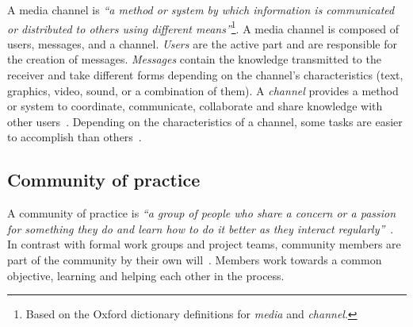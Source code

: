     A media channel is \textit{``a method or system by which information is communicated or distributed to others using different means''}\footnote{Based on the Oxford dictionary definitions for \emph{media} and \emph{channel}.}.
    A media channel is composed of users, messages, and a channel.
    \textit{Users} are the active part and are responsible for the creation of messages.
    \textit{Messages} contain the knowledge transmitted to the receiver and take different forms depending on the channel's characteristics (text, graphics, video, sound, or a combination of them).
    A \textit{channel} provides a method or system to coordinate, communicate, collaborate and share knowledge with other users~\cite{Storey2014}.
Depending on the characteristics of a channel, some tasks are easier to accomplish than others~\cite{Storey2014,Vasilescu2014b}.


\subsection{Community of practice}

    A community of practice is \textit{``a group of people who share a concern or a passion for something they do and learn how to do it better as they interact regularly''}~\cite{Wenger2000}.
    In contrast with formal work groups and project teams, community members are part of the community by their own will~\cite{Wenger2000}.
    Members work towards a common objective, learning and helping each other in the process.

